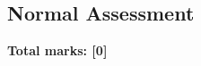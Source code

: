 \documentclass[../s1]{subfiles}
\begin{document}
\subsection*{Normal Assessment}
\thispagestyle{fancy}



\begin{flushright}
\textbf{Total marks: [0]}
\end{flushright}
\end{document}
